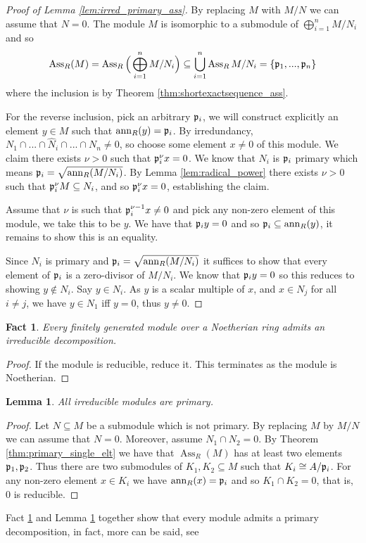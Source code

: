 \documentclass[12pt]{article}
\theoremstyle{plain}
\newtheorem{lemma}[thm]{Lemma}
\newtheorem{fact}[thm]{Fact}
\theoremstyle{definition}
\begin{document}
	\begin{proof}[Proof of Lemma \ref{lem:irred_primary_ass}]
		By replacing $M$ with $M/N$ we can assume that $N = 0$. The module $M$ is isomorphic to a submodule of $\bigoplus_{i = 1}^nM/N_i$ and so
		\[\operatorname{Ass}_R(M) = \operatorname{Ass}_R\Big(\bigoplus_{i = 1}^nM/N_i\Big) \subseteq \bigcup_{i = 1}^n \operatorname{Ass}_RM/N_i = \lbrace \frak{p}_1,...,\frak{p}_n\rbrace\]
		where the inclusion is by Theorem \ref{thm:shortexactsequence_ass}.
		
		For the reverse inclusion, pick an arbitrary $\frak{p}_i$, we will construct explicitly an element $y\in M$ such that $\operatorname{ann}_R(y) = \frak{p}_i$. By irredundancy, $N_1 \cap ... \cap \hat{N}_i \cap ... \cap N_n \neq 0$, so choose some element $x \neq 0$ of this module. We claim there exists $\nu > 0$ such that $\frak{p}_i^\nu x = 0$. We know that $N_i$ is $\frak{p}_i$ primary which means $\frak{p}_i = \sqrt{\operatorname{ann}_R(M/N_i)}$. By Lemma \ref{lem:radical_power} there exists $\nu > 0$ such that $\frak{p}_i^\nu M \subseteq N_i$, and so $\frak{p}_i^{\nu}x = 0$, establishing the claim.
		
		Assume that $\nu$ is such that $\frak{p}_i^{\nu - 1}x \neq 0$ and pick any non-zero element of this module, we take this to be $y$. We have that $\frak{p}_iy = 0$ and so $\frak{p}_i \subseteq \operatorname{ann}_R(y)$, it remains to show this is an equality.
		
		Since $N_i$ is primary and $\frak{p}_i = \sqrt{\operatorname{ann}_R(M/N_i)}$ it suffices to show that every element of $\frak{p}_i$ is a zero-divisor of $M/N_i$. We know that $\frak{p}_i y = 0$ so this reduces to showing $y \not\in N_i$. Say $y \in N_i$. As $y$ is a scalar multiple of $x$, and $x \in N_j$ for all $i \neq j$, we have $y \in N_1$ iff $y = 0$, thus $y \neq 0$.
	\end{proof}
	\begin{fact}
		\label{fact:irreducible_decomp} Every finitely generated module over a Noetherian ring admits an irreducible decomposition.
	\end{fact}
	\begin{proof}
		If the module is reducible, reduce it. This terminates as the module is Noetherian.
	\end{proof}
	\begin{lemma}
		\label{lem:irred_primary} All irreducible modules are primary.
	\end{lemma}
	\begin{proof}
		Let $N \subseteq M$ be a submodule which is not primary. By replacing $M$ by $M/N$ we can assume that $N = 0$. Moreover, assume $N_1 \cap N_2 = 0$. By Theorem \ref{thm:primary_single_elt} we have that $\operatorname{Ass}_R(M)$ has at least two elements $\frak{p}_1,\frak{p}_2$. Thus there are two submodules of $K_1,K_2 \subseteq M$ such that $K_i \cong A/\frak{p}_i$. For any non-zero element $x \in K_i$ we have $\operatorname{ann}_R(x) = \frak{p}_i$ and so $K_1 \cap K_2 = 0$, that is, $0$ is reducible.
	\end{proof}
	Fact \ref{fact:irreducible_decomp} and Lemma \ref{lem:irred_primary} together show that every module admits a primary decomposition, in fact, more can be said, see \cite[\S 2.6 Thm 6.8]{matsumura}
\end{document}
